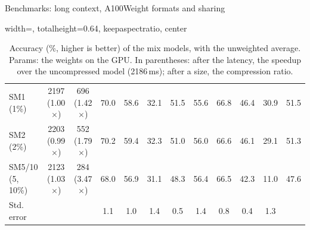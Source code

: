 \documentclass[aspectratio=169,10pt]{beamer}
\begin{document}
\begin{frame}{Benchmarks: long context, A100}{Weight formats and sharing}
\begin{table}
\begin{adjustbox}{width=\linewidth, totalheight=0.64\textheight, keepaspectratio, center}
\begin{tabular}{lccccccccccc}
SM1 (1\%) & 2197 (1.00$\times$) & 696 (1.42$\times$) & 70.0 & 58.6 & 32.1 & 51.5 & 55.6 & 66.8 & 46.4 & 30.9 & 51.5 \\
SM2 (2\%) & 2203 (0.99$\times$) & 552 (1.79$\times$) & 70.2 & 59.4 & 32.3 & 51.0 & 56.0 & 66.6 & 46.1 & 29.1 & 51.3 \\
SM5/10 (5, 10\%) & 2123 (1.03$\times$) & 284 (3.47$\times$) & 68.0 & 56.9 & 31.1 & 48.3 & 56.4 & 66.5 & 42.3 & 11.0 & 47.6 \\
\midrule
Std. error & & & 1.1 & 1.0 & 1.4 & 0.5 & 1.4 & 0.8 & 0.4 & 1.3 &  \\
\bottomrule
\end{tabular}
\end{adjustbox}
\caption{Accuracy (\%, higher is better) of the mix models, with the unweighted average. Params: the weights on the GPU. In parentheses: after the latency, the speedup over the uncompressed model (2186\,ms); after a size, the compression ratio.}\label{tab:turnresults}
\end{table}
\end{frame}
\end{document}
